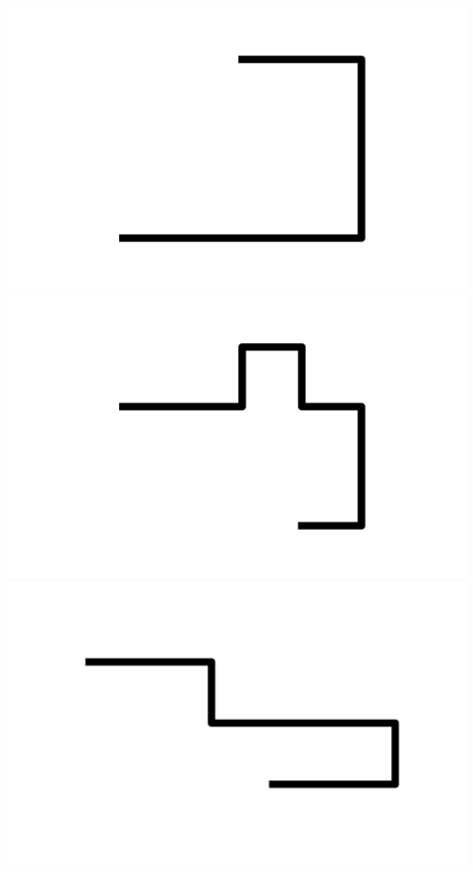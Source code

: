 \documentclass[]{report}
\begin{document}
\includegraphics[scale=.1]{pictures/21/state_cluster_shapes_82.pdf} 
\includegraphics[scale=.1]{pictures/21/state_cluster_shapes_83.pdf} 
\includegraphics[scale=.1]{pictures/21/state_cluster_shapes_84.pdf} 
\end{document}
